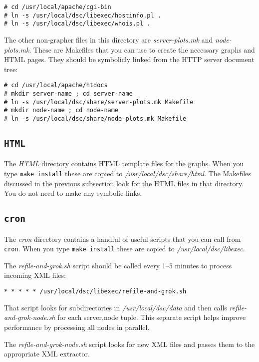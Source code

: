 \documentclass{report}
\begin{document}
\begin{verbatim}
# cd /usr/local/apache/cgi-bin
# ln -s /usr/local/dsc/libexec/hostinfo.pl .
# ln -s /usr/local/dsc/libexec/whois.pl .
\end{verbatim}

\noindent
The other non-grapher files in this directory are {\em server-plots.mk\/}
and {\em node-plots.mk\/}.  These are Makefiles that you can use to create
the necessary graphs and HTML pages.  They should be symbolicly linked
from the HTTP server document tree:

\begin{verbatim}
# cd /usr/local/apache/htdocs
# mkdir server-name ; cd server-name
# ln -s /usr/local/dsc/share/server-plots.mk Makefile
# mkdir node-name ; cd node-name
# ln -s /usr/local/dsc/share/node-plots.mk Makefile
\end{verbatim}

\subsection{\tt HTML}

The {\em HTML\/} directory contains HTML template files for the graphs.
When you type {\tt make install\/} these are copied to
{\em /usr/local/dsc/share/html\/}.  The Makefiles discussed in
the previous subsection look for the HTML files in that directory.
You do not need to make any symbolic links.

\subsection{\tt cron}

The {\em cron\/} directory contains a handful of useful scripts that you can
call from {\tt cron\/}.  When you type {\tt make install\/} these are copied
to {\em /usr/local/dsc/libexec\/}.

The {\em refile-and-grok.sh\/} script should be called every 1--5 minutes to process
incoming XML files:

\begin{verbatim}
* * * * * /usr/local/dsc/libexec/refile-and-grok.sh
\end{verbatim}

That script looks for subdirectories in {\em /usr/local/dsc/data\/}
and then calls {\em refile-and-grok-node.sh\/} for each server,node tuple.
This separate script helps improve performance by processing all nodes
in parallel.  

The {\em refile-and-grok-node.sh\/} script looks for new XML files and passes
them to the appropriate XML extractor.  
\end{document}
